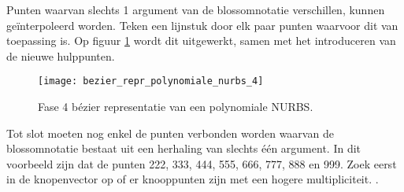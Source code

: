 \documentclass{report}
\begin{document}
\begin{itemize}
{\begin{itemize}
			Punten waarvan slechts 1 argument van de blossomnotatie verschillen, kunnen geïnterpoleerd worden. Teken een lijnstuk door elk paar punten waarvoor dit van toepassing is. Op figuur \ref{fig:bezier_repr_polynomiale_nurbs_4} wordt dit uitgewerkt, samen met het introduceren van de nieuwe hulppunten.
			\begin{figure}[ht]
				\centering
				\texttt{[image: bezier\_repr\_polynomiale\_nurbs\_4]}	
				\caption{Fase 4 bézier representatie van een polynomiale NURBS.}
				\label{fig:bezier_repr_polynomiale_nurbs_4}
			\end{figure}

			Tot slot moeten nog enkel de punten verbonden worden waarvan de blossomnotatie bestaat uit een herhaling van slechts één argument. In dit voorbeeld zijn dat de punten 222, 333, 444, 555, 666, 777, 888 en 999. Zoek eerst in de knopenvector op of er knooppunten zijn met een hogere multipliciteit. .
			

\end{itemize}}
\end{itemize}
\end{document}
